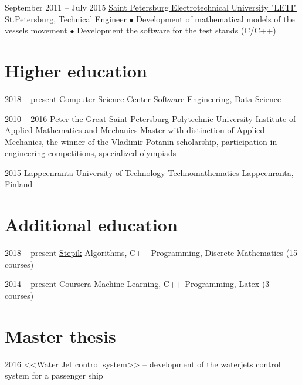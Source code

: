 \documentclass[11pt,a4paper]{moderncv}
\def\mark{{\tiny$\bullet$} }
\begin{document}
\cventry
    {September 2011 -- July 2015}
    {\href{https://etu.ru/}{Saint Petersburg Electrotechnical University "LETI"}}
    {\newline St.Petersburg, Technical Engineer}
    {}
    {}
    {
        \mark Development of mathematical models of the vessels movement
        \newline
        \mark Development the software for the test stands (C/C++)
    }

\section{Higher education}
\cventry
    {2018 -- present}
    {\href{https://compscicenter.ru/users/4612/}
    {Computer Science Center}}
    {Software Engineering, Data Science}
    {}
    {}
    {}

\cventry
    {2010 -- 2016}
    {\href{http://www.spbstu.ru/}{Peter the Great Saint Petersburg Polytechnic University}}
    {\newline Institute of Applied Mathematics and Mechanics}
    {\newline Master with distinction of Applied Mechanics,
    \newline the winner of the Vladimir Potanin scholarship,
    participation in engineering competitions, specialized olympiads}
    {}
    {}

\cventry
    {2015}
    {\href{https://www.lut.fi/web/en/}{Lappeenranta University of Technology}}
    {Technomathematics}
    {}
    {}
    {Lappeenranta, Finland}
    
\section{Additional education}
\cventry
    {2018 -- present}
    {\href{https://stepik.org/users/57620777}{Stepik}}
    {Algorithms, C++ Programming, Discrete Mathematics (15 courses)}
    {}
    {}
    {}

\cventry
    {2014 -- present}
    {\href{https://www.coursera.org/user/6824f02bb7dea6b34f4c85686333f84c}{Coursera}}
    {Machine Learning, C++ Programming, Latex (3 courses)}
    {}
    {}
    {}

\pagebreak

\section{Master thesis}
\cvline
    {2016}
    {<<Water Jet control system>> -- development of the waterjets control system for a passenger ship}
\end{document}
